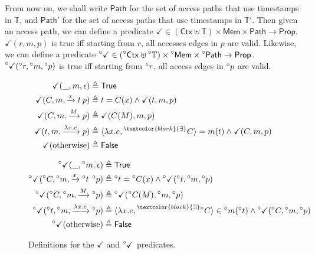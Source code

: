 \documentclass[acmsmall,screen,review]{acmart}\settopmatter{printfolios=true,printccs=false,printacmref=false}
\newcommand*{\prexists}[2][black]{\prescript{\textcolor{#1}{\exists}}{}{#2}}
\newcommand*{\A}[1]{\prescript{\circ}{}{#1}}
\newcommand*{\Time}{\mathbb{T}}
\newcommand*{\Ctx}{\mathsf{Ctx}}
\newcommand*{\Mem}{\mathsf{Mem}}
\newcommand*{\mem}{m}
\newcommand*{\valid}{\checkmark}
\newcommand*{\Path}{\mathsf{Path}}
\begin{document}
From now on, we shall write $\Path$ for the set of access paths that use timestamps in $\Time$, and $\Path'$ for the set of access paths that use timestamps in $\Time'$.
Then given an access path, we can define a predicate $\valid\in(\Ctx\uplus\Time)\times\Mem\times\Path\rightarrow\mathsf{Prop}$.
$\valid(r,\mem,p)$ is true iff starting from $r$, all accesses edges in $p$ are valid.
Likewise, we can define a predicate $\A\valid\in(\A\Ctx\uplus\A\Time)\times\A\Mem\times\A\Path\rightarrow\mathsf{Prop}$.
$\A\valid(\A{r},\A\mem,\A{p})$ is true iff starting from $\A{r}$, all access edges in $\A{p}$ are valid.
\begin{figure}[t!]
  \centering
  \begin{minipage}{0.4\linewidth}
    \footnotesize
    \begin{align*}
      \valid(\_,\mem,\epsilon)                  & \triangleq\mathsf{True}                                                        \\
      \valid(C,\mem,\xrightarrow{x}t\:p)        & \triangleq t=C(x)\wedge\valid(t,\mem,p)                                        \\
      \valid(C,\mem,\xrightarrow{M}p)           & \triangleq\valid(C(M),\mem,p)                                                  \\
      \valid(t,\mem,\xrightarrow{\lambda x.e}p) & \triangleq\langle\lambda x.e,\prexists{C}\rangle=\mem(t)\wedge\valid(C,\mem,p) \\
      \valid(\text{otherwise})                  & \triangleq\mathsf{False}
    \end{align*}
  \end{minipage}
  \begin{minipage}{0.4\linewidth}
    \footnotesize
    \begin{align*}
      \A\valid(\_,\A\mem,\epsilon)                          & \triangleq\mathsf{True}                                                                                \\
      \A\valid(\A{C},\A\mem,\xrightarrow{x}\A{t}\:\A{p})    & \triangleq\A{t}=\A{C}(x)\wedge\A\valid(\A{t},\A\mem,\A{p})                                             \\
      \A\valid(\A{C},\A\mem,\xrightarrow{M}\A{p})           & \triangleq\A\valid(\A{C}(M),\A\mem,\A{p})                                                              \\
      \A\valid(\A{t},\A\mem,\xrightarrow{\lambda x.e}\A{p}) & \triangleq\langle\lambda x.e,\prexists{\A{C}}\rangle\in\A\mem(\A{t})\wedge\A\valid(\A{C},\A\mem,\A{p}) \\
      \A\valid(\text{otherwise})                            & \triangleq\mathsf{False}
    \end{align*}
  \end{minipage}
  \caption{Definitions for the $\valid$ and $\A\valid$ predicates.}
  \label{fig:valid}
  \vspace{-1em}
\end{figure}
\end{document}
